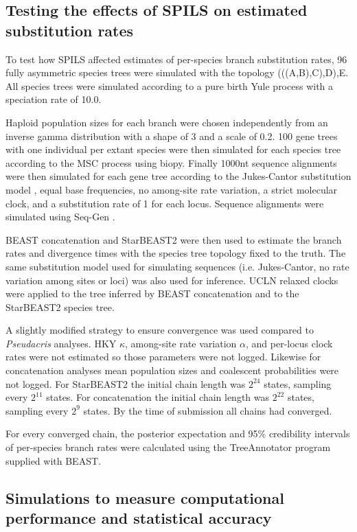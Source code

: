\documentclass[nogrid]{MBE}%
\begin{document}
\subsection{Testing the effects of SPILS on estimated substitution rates}

To test how SPILS affected estimates of per-species branch substitution rates,
96 fully asymmetric species trees were simulated with the topology
(((A,B),C),D),E. All species trees were simulated according to a pure birth Yule
process \citep{Yule21} with a speciation rate of 10.0.

Haploid population sizes for each branch were chosen independently from an
inverse gamma distribution with a shape of 3 and a scale of 0.2. 100 gene trees
with one individual per extant species were then simulated for each species tree
according to the MSC process using biopy. Finally 1000nt sequence alignments
were then simulated for each gene tree according to the Jukes-Cantor
substitution model \citep{JUKES196921}, equal base frequencies, no among-site
rate variation, a strict molecular clock, and a substitution rate of 1 for each
locus. Sequence alignments were simulated using Seq-Gen \citep{Rambaut01061997}.

BEAST concatenation and StarBEAST2 were then used to estimate the branch rates
and divergence times with the species tree topology fixed to the truth. The same
substitution model used for simulating sequences (i.e. Jukes-Cantor, no rate
variation among sites or loci) was also used for inference. UCLN relaxed
clocks were applied to the tree inferred by BEAST concatenation and to the
StarBEAST2 species tree.

A slightly modified strategy to ensure convergence was used compared to
\textit{Pseudacris} analyses. HKY $\kappa$, among-site rate variation $\alpha$,
and per-locus clock rates were not estimated so those parameters were not
logged. Likewise for concatenation analyses mean population sizes and coalescent
probabilities were not logged. For StarBEAST2 the initial chain length was
$2^{24}$ states, sampling every $2^{11}$ states. For concatenation the initial
chain length was $2^{22}$ states, sampling every $2^{9}$ states. By the time of
submission all chains had converged.

For every converged chain, the posterior expectation and 95\% credibility
intervals of per-species branch rates were calculated using the TreeAnnotator
program supplied with BEAST.

\subsection{Simulations to measure computational performance and statistical accuracy}
\end{document}
